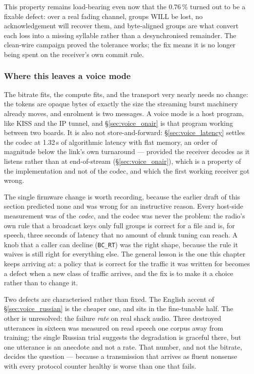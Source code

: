 This property remains load-bearing even now that the 0.76\,\% turned
out to be a fixable defect: over a real fading channel, groups WILL be
lost, no acknowledgement will recover them, and byte-aligned groups
are what convert each loss into a missing syllable rather than a
desynchronised remainder.  The clean-wire campaign proved the
tolerance works; the fix means it is no longer being spent on the
receiver's own commit rule.

\subsubsection{Where this leaves a voice mode}

The bitrate fits, the compute fits, and the transport very nearly
needs no change: the tokens are opaque bytes of exactly the size the
streaming burst machinery already moves, and enrolment is two messages.
A voice mode is a host program, like KISS and the IP tunnel, and
\S\ref{sec:voice_onair} is that program working between two boards.
It is also not store-and-forward: \S\ref{sec:voice_latency} settles
the codec at 1.32\,s of algorithmic latency with flat memory, an order
of magnitude below the link's own turnaround --- provided the receiver
decodes as it listens rather than at end-of-stream
(\S\ref{sec:voice_onair}), which is a property of the implementation
and not of the codec, and which the first working receiver got wrong.

The single firmware change is worth recording, because the earlier
draft of this section predicted none and was wrong for an instructive
reason.  Every host-side measurement was of the \emph{codec}, and the
codec was never the problem: the radio's own rule that a broadcast keys
only full groups is correct for a file and is, for speech, three
seconds of latency that no amount of chunk tuning can reach.  A knob
that a caller can decline (\texttt{BC\_RT}) was the right shape,
because the rule it waives is still right for everything else.  The
general lesson is the one this chapter keeps arriving at: a policy that
is correct for the traffic it was written for becomes a defect when a
new class of traffic arrives, and the fix is to make it a choice rather
than to change it.

Two defects are characterised rather than fixed.  The English accent of
\S\ref{sec:voice_russian} is the cheaper one, and sits in the
fine-tunable half.  The other is unresolved: the failure \emph{rate} on
real shack audio.
Three destroyed utterances in sixteen was measured on read speech one
corpus away from training; the single Russian trial suggests the
degradation is graceful there, but one utterance is an anecdote and not
a rate.  That number, and not the bitrate, decides the question ---
because a transmission that arrives as fluent nonsense with every
protocol counter healthy is worse than one that fails.

